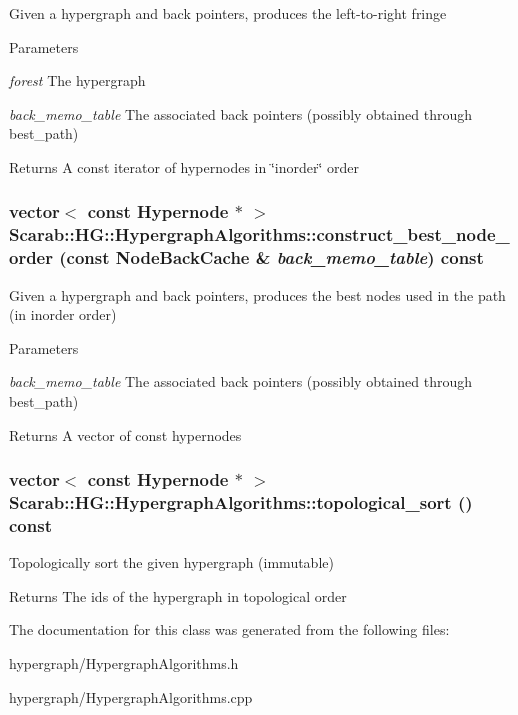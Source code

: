 \label{classScarab_1_1HG_1_1HypergraphAlgorithms_af5bcb325e1d58dd9d4c26517c4dfeca0}
Given a hypergraph and back pointers, produces the left-\/to-\/right fringe 
\begin{DoxyParams}{Parameters}
\item[{\em forest}]The hypergraph \item[{\em back\_\-memo\_\-table}]The associated back pointers (possibly obtained through best\_\-path) \end{DoxyParams}
\begin{DoxyReturn}{Returns}
A const iterator of hypernodes in \char`\"{}inorder\char`\"{} order 
\end{DoxyReturn}
\hypertarget{classScarab_1_1HG_1_1HypergraphAlgorithms_acf3eea6f89752404f12c0a3dd45d397d}{
\subsubsection[{construct\_\-best\_\-node\_\-order}]{\setlength{\rightskip}{0pt plus 5cm}vector$<$ const {\bf Hypernode} $\ast$ $>$ Scarab::HG::HypergraphAlgorithms::construct\_\-best\_\-node\_\-order (const {\bf NodeBackCache} \& {\em back\_\-memo\_\-table}) const}}
\label{classScarab_1_1HG_1_1HypergraphAlgorithms_acf3eea6f89752404f12c0a3dd45d397d}
Given a hypergraph and back pointers, produces the best nodes used in the path (in inorder order)


\begin{DoxyParams}{Parameters}
\item[{\em back\_\-memo\_\-table}]The associated back pointers (possibly obtained through best\_\-path) \end{DoxyParams}
\begin{DoxyReturn}{Returns}
A vector of const hypernodes 
\end{DoxyReturn}
\hypertarget{classScarab_1_1HG_1_1HypergraphAlgorithms_afeb33bac104955747948b3d4a885cdc4}{
\subsubsection[{topological\_\-sort}]{\setlength{\rightskip}{0pt plus 5cm}vector$<$ const {\bf Hypernode} $\ast$ $>$ Scarab::HG::HypergraphAlgorithms::topological\_\-sort () const}}
\label{classScarab_1_1HG_1_1HypergraphAlgorithms_afeb33bac104955747948b3d4a885cdc4}
Topologically sort the given hypergraph (immutable) \begin{DoxyReturn}{Returns}
The ids of the hypergraph in topological order 
\end{DoxyReturn}


The documentation for this class was generated from the following files:\begin{DoxyCompactItemize}
\item 
hypergraph/HypergraphAlgorithms.h\item 
hypergraph/HypergraphAlgorithms.cpp\end{DoxyCompactItemize}
